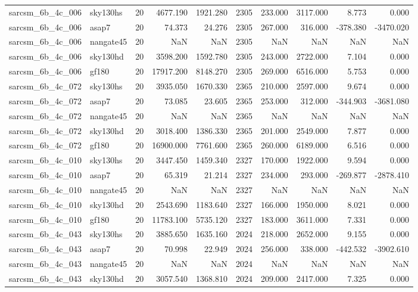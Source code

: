 \begin{tabular}{llrrrrrrrr}
sarcsm\_6b\_4c\_006 & sky130hs & 20 & 4677.190 & 1921.280 & 2305 & 233.000 & 3117.000 & 8.773 & 0.000 \\
sarcsm\_6b\_4c\_006 & asap7 & 20 & 74.373 & 24.276 & 2305 & 267.000 & 316.000 & -378.380 & -3470.020 \\
sarcsm\_6b\_4c\_006 & nangate45 & 20 & NaN & NaN & 2305 & NaN & NaN & NaN & NaN \\
sarcsm\_6b\_4c\_006 & sky130hd & 20 & 3598.200 & 1592.780 & 2305 & 243.000 & 2722.000 & 7.104 & 0.000 \\
sarcsm\_6b\_4c\_006 & gf180 & 20 & 17917.200 & 8148.270 & 2305 & 269.000 & 6516.000 & 5.753 & 0.000 \\
sarcsm\_6b\_4c\_072 & sky130hs & 20 & 3935.050 & 1670.330 & 2365 & 210.000 & 2597.000 & 9.674 & 0.000 \\
sarcsm\_6b\_4c\_072 & asap7 & 20 & 73.085 & 23.605 & 2365 & 253.000 & 312.000 & -344.903 & -3681.080 \\
sarcsm\_6b\_4c\_072 & nangate45 & 20 & NaN & NaN & 2365 & NaN & NaN & NaN & NaN \\
sarcsm\_6b\_4c\_072 & sky130hd & 20 & 3018.400 & 1386.330 & 2365 & 201.000 & 2549.000 & 7.877 & 0.000 \\
sarcsm\_6b\_4c\_072 & gf180 & 20 & 16900.000 & 7761.600 & 2365 & 260.000 & 6189.000 & 6.516 & 0.000 \\
sarcsm\_6b\_4c\_010 & sky130hs & 20 & 3447.450 & 1459.340 & 2327 & 170.000 & 1922.000 & 9.594 & 0.000 \\
sarcsm\_6b\_4c\_010 & asap7 & 20 & 65.319 & 21.214 & 2327 & 234.000 & 293.000 & -269.877 & -2878.410 \\
sarcsm\_6b\_4c\_010 & nangate45 & 20 & NaN & NaN & 2327 & NaN & NaN & NaN & NaN \\
sarcsm\_6b\_4c\_010 & sky130hd & 20 & 2543.690 & 1183.640 & 2327 & 166.000 & 1950.000 & 8.021 & 0.000 \\
sarcsm\_6b\_4c\_010 & gf180 & 20 & 11783.100 & 5735.120 & 2327 & 183.000 & 3611.000 & 7.331 & 0.000 \\
sarcsm\_6b\_4c\_043 & sky130hs & 20 & 3885.650 & 1635.160 & 2024 & 218.000 & 2652.000 & 9.155 & 0.000 \\
sarcsm\_6b\_4c\_043 & asap7 & 20 & 70.998 & 22.949 & 2024 & 256.000 & 338.000 & -442.532 & -3902.610 \\
sarcsm\_6b\_4c\_043 & nangate45 & 20 & NaN & NaN & 2024 & NaN & NaN & NaN & NaN \\
sarcsm\_6b\_4c\_043 & sky130hd & 20 & 3057.540 & 1368.810 & 2024 & 209.000 & 2417.000 & 7.325 & 0.000 \\

\end{tabular}
